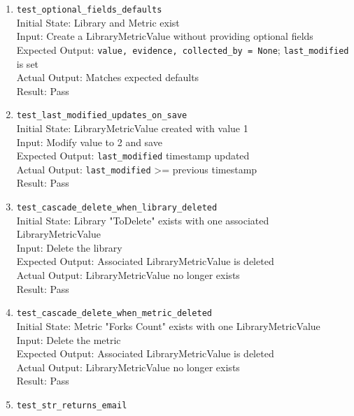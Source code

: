 \documentclass[12pt, titlepage]{article}
\begin{document}
\begin{enumerate}
      \\Result: Pass
    \item \texttt{test\_optional\_fields\_defaults} \label{test-optional-fields-defaults}
      \\Initial State: Library and Metric exist
      \\Input: Create a LibraryMetricValue without providing optional fields
      \\Expected Output: \texttt{value, evidence, collected\_by = None}; \texttt{last\_modified} is set
      \\Actual Output: Matches expected defaults
      \\Result: Pass
    \item \texttt{test\_last\_modified\_updates\_on\_save} \label{test-last-modified-updates-on-save}
      \\Initial State: LibraryMetricValue created with value 1
      \\Input: Modify value to 2 and save
      \\Expected Output: \texttt{last\_modified} timestamp updated
      \\Actual Output: \texttt{last\_modified} >= previous timestamp
      \\Result: Pass
    \item \texttt{test\_cascade\_delete\_when\_library\_deleted} \label{test-cascade-delete-when-library-deleted}
      \\Initial State: Library "ToDelete" exists with one associated LibraryMetricValue
      \\Input: Delete the library
      \\Expected Output: Associated LibraryMetricValue is deleted
      \\Actual Output: LibraryMetricValue no longer exists
      \\Result: Pass
    \item \texttt{test\_cascade\_delete\_when\_metric\_deleted} \label{test-cascade-delete-when-metric-deleted}
      \\Initial State: Metric "Forks Count" exists with one LibraryMetricValue
      \\Input: Delete the metric
      \\Expected Output: Associated LibraryMetricValue is deleted
      \\Actual Output: LibraryMetricValue no longer exists
      \\Result: Pass
    \item \texttt{test\_str\_returns\_email} \label{test-str-returns-email}

\end{enumerate}
\end{document}
